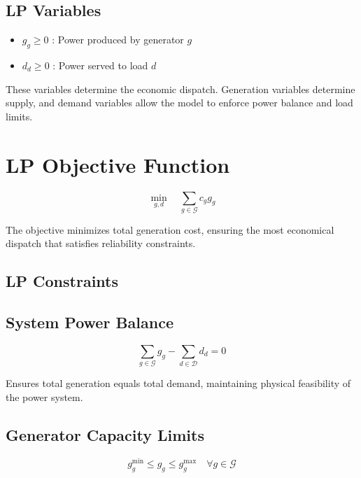 \documentclass[11pt]{article}
\begin{document}
\subsection{LP Variables}

\begin{itemize}
    \item $g_g \ge 0$ : Power produced by generator $g$
    \item $d_d \ge 0$ : Power served to load $d$
\end{itemize}

 
These variables determine the economic dispatch. Generation variables determine supply, and demand variables allow the model to enforce power balance and load limits.

\section*{LP Objective Function}

\begin{equation}
\min_{g,d} \quad \sum_{g \in \mathcal{G}} c_g g_g
\end{equation}

 
The objective minimizes total generation cost, ensuring the most economical dispatch that satisfies reliability constraints.

\subsection{LP Constraints}

\subsection{System Power Balance}

\begin{equation}
\sum_{g \in \mathcal{G}} g_g
-
\sum_{d \in \mathcal{D}} d_d
= 0
\end{equation}

 
Ensures total generation equals total demand, maintaining physical feasibility of the power system.

\subsection{Generator Capacity Limits}

\begin{equation}
g_g^{\min} \le g_g \le g_g^{\max}
\quad \forall g \in \mathcal{G}
\end{equation}
\end{document}
